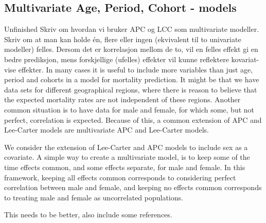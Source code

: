 \subsection{Multivariate Age, Period, Cohort - models}
\label{sec:multivariateAPC}
\textcolor{myDarkBlue}{Unfinished}
\textcolor{myDarkGreen}{
Skriv om hvordan vi bruker APC og LCC som multivariate modeller. Skriv om at man kan holde én, flere eller ingen (ekvivalent til to univariate modeller) felles. Dersom det er korrelasjon mellom de to, vil en felles effekt gi en bedre prediksjon, mens forskjellige (ufelles) effekter vil kunne reflektere kovariat-vise effekter. 
}
In many cases it is useful to include more variables than just age, period and cohorts in a model for mortality prediction. It might be that we have data sets for different geographical regions, where there is reason to believe that the expected mortality rates are not independent of these regions. Another common situation is to have data for male and female, for which some, but not perfect, correlation is expected. Because of this, a common extension of APC and Lee-Carter models are multivariate APC and Lee-Carter models. 

We consider the extension of Lee-Carter and APC models to include sex as a covariate. A simple way to create a multivariate model, is to keep some of the time effects common, and some effects separate, for male and female. In this framework, keeping all effects common corresponds to considering perfect correlation between male and female, and keeping no effects common corresponds to treating male and female as uncorrelated populations. 

\textcolor{myDarkGreen}{This needs to be better, also include some references. }